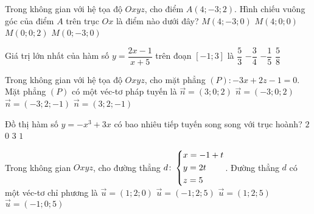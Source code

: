 \begin{ex}%
Trong không gian với hệ tọa độ $Oxyz$, cho điểm $A(4; -3; 2)$. Hình chiếu vuông góc của điểm $A$ trên trục $Ox$ là điểm nào dưới đây?
\choice
{$M(4; -3; 0)$}
{\True $M(4; 0; 0)$}
{$M(0; 0; 2)$}
{$M(0; -3; 0)$}
\end{ex}


\begin{ex}%
Giá trị lớn nhất của hàm số $y = \dfrac{2x - 1}{x + 5}$ trên đoạn $\left[-1; 3\right]$ là
\choice
{$\dfrac{5}{3}$}
{$-\dfrac{3}{4}$}
{$-\dfrac{1}{5}$}
{\True $\dfrac{5}{8}$}
\end{ex}


\begin{ex}%
Trong không gian với hệ tọa độ $Oxyz$, cho mặt phẳng $(P)\colon -3x + 2z - 1 = 0$. Mặt phẳng $(P)$ có một véc-tơ pháp tuyến là
\choice
{$\overrightarrow{n} = (3; 0; 2)$}
{\True $\overrightarrow{n} = (-3; 0; 2)$}
{$\overrightarrow{n} = (-3; 2; -1)$}
{$\overrightarrow{n} = (3; 2; -1)$}
\end{ex}


\begin{ex}%
Đồ thị hàm số $y = -x^3 + 3x$ có bao nhiêu tiếp tuyến song song với trục hoành?
\choice
{\True $2$}
{$0$}
{$3$}
{$1$}
\end{ex}


\begin{ex}%
Trong không gian $Oxyz$, cho đường thẳng $d\colon \left\{\begin{aligned}&x = -1+t\\&y = 2t\\&z = 5\end{aligned}\right.$. Đường thẳng $d$ có một véc-tơ chỉ phương là
\choice
{\True $\overrightarrow{u} = (1; 2; 0)$}
{$\overrightarrow{u} = (-1; 2; 5)$}
{$\overrightarrow{u} = (1; 2; 5)$}
{$\overrightarrow{u} = (-1; 0; 5)$}
\end{ex}


